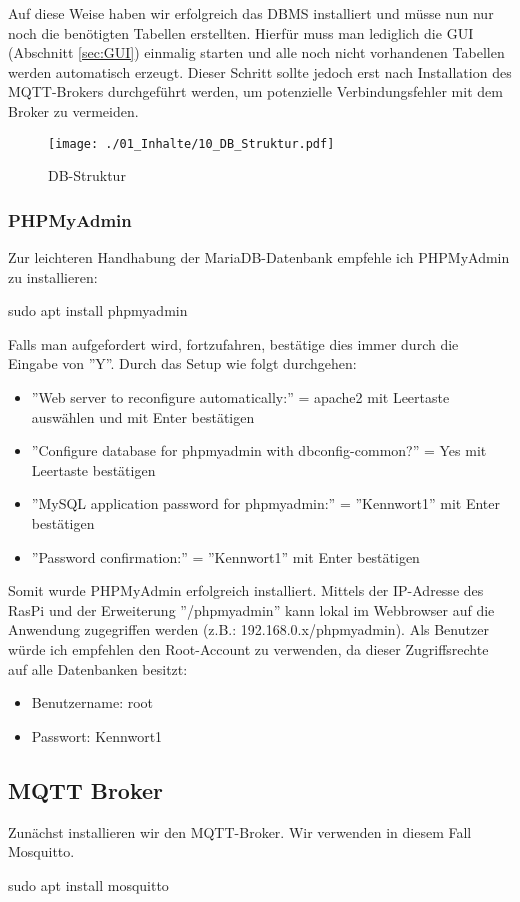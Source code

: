 Auf diese Weise haben wir erfolgreich das \ac{DBMS} installiert und müsse nun nur noch die benötigten Tabellen erstellten. Hierfür muss man lediglich die \ac{GUI} (Abschnitt \ref{sec:GUI}) einmalig starten und alle noch nicht vorhandenen Tabellen werden automatisch erzeugt. Dieser Schritt sollte jedoch erst nach Installation des MQTT-Brokers durchgeführt werden, um potenzielle Verbindungsfehler mit dem  Broker zu vermeiden.

\begin{figure}[H]
	\texttt{[image: ./01\_Inhalte/10\_DB\_Struktur.pdf]}
	\centering
	\caption{\ac{DB}-Struktur}
\end{figure}


\subsubsection{PHPMyAdmin}
Zur leichteren Handhabung der MariaDB-Datenbank empfehle ich PHPMyAdmin zu installieren:
\begin{Textfeld1}
	sudo apt install phpmyadmin
\end{Textfeld1}
Falls man aufgefordert wird, fortzufahren, bestätige dies immer durch die Eingabe von ''Y''. Durch das Setup wie folgt durchgehen:
\begin{itemize}
	\item ''Web server to reconfigure automatically:'' = apache2 mit Leertaste auswählen und mit Enter bestätigen
	\item ''Configure database for phpmyadmin with dbconfig-common?'' = Yes mit Leertaste bestätigen
	\item ''MySQL application password for phpmyadmin:'' = ''Kennwort1'' mit Enter bestätigen
	\item ''Password confirmation:'' = ''Kennwort1'' mit Enter bestätigen
\end{itemize}
Somit wurde PHPMyAdmin erfolgreich installiert. Mittels der IP-Adresse des \ac{RasPi} und der Erweiterung ''/phpmyadmin'' kann lokal im Webbrowser auf die Anwendung zugegriffen werden (z.B.: 192.168.0.x/phpmyadmin). Als Benutzer würde ich empfehlen den Root-Account zu verwenden, da dieser Zugriffsrechte auf alle Datenbanken besitzt:
\begin{itemize}
	\item Benutzername: root
	\item Passwort: Kennwort1
\end{itemize} 


\subsection{MQTT Broker}
Zunächst installieren wir den MQTT-Broker. Wir verwenden in diesem Fall Mosquitto.
\begin{Textfeld1}
	sudo apt install mosquitto
\end{Textfeld1}

